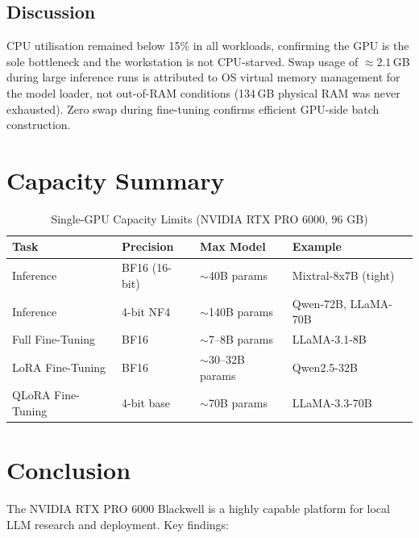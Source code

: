 \documentclass[11pt,a4paper]{article}
\begin{document}
\subsection{Discussion}
CPU utilisation remained below 15\% in all workloads, confirming the GPU is the
sole bottleneck and the workstation is not CPU-starved. Swap usage of
$\approx2.1$\,GB during large inference runs is attributed to OS virtual memory
management for the model loader, not out-of-RAM conditions (134\,GB physical RAM
was never exhausted). Zero swap during fine-tuning confirms efficient GPU-side
batch construction.

\section{Capacity Summary}

\begin{table}[h!]
\centering
\caption{Single-GPU Capacity Limits (NVIDIA RTX PRO 6000, 96 GB)}
\label{tab:limits}
\begin{tabular}{llll}
\toprule
\textbf{Task} & \textbf{Precision} & \textbf{Max Model} & \textbf{Example} \\
\midrule
Inference & BF16 (16-bit)        & $\sim$40B params & Mixtral-8x7B (tight) \\
Inference & 4-bit NF4            & $\sim$140B params & Qwen-72B, LLaMA-70B \\
\midrule
Full Fine-Tuning & BF16          & $\sim$7–8B params & LLaMA-3.1-8B \\
LoRA Fine-Tuning & BF16          & $\sim$30–32B params & Qwen2.5-32B \\
QLoRA Fine-Tuning & 4-bit base  & $\sim$70B params & LLaMA-3.3-70B \\
\bottomrule
\end{tabular}
\end{table}

\section{Conclusion}

The NVIDIA RTX PRO 6000 Blackwell is a highly capable platform for local LLM
research and deployment. Key findings:
\end{document}
